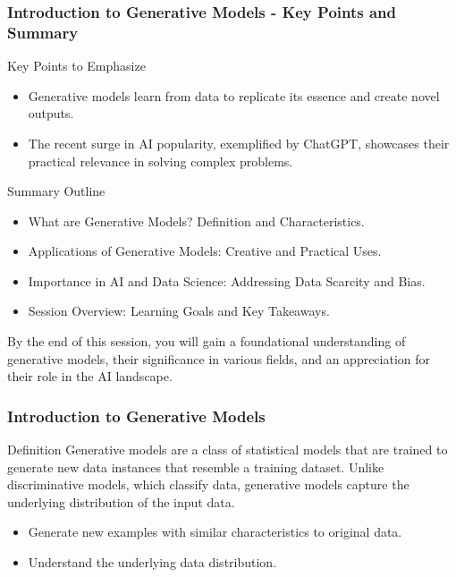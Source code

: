 \documentclass[aspectratio=169]{beamer}
\begin{document}
\begin{frame}[fragile]
    \frametitle{Introduction to Generative Models - Key Points and Summary}
    \begin{block}{Key Points to Emphasize}
        \begin{itemize}
            \item Generative models learn from data to replicate its essence and create novel outputs.
            \item The recent surge in AI popularity, exemplified by ChatGPT, showcases their practical relevance in solving complex problems.
        \end{itemize}
    \end{block}
    
    \begin{block}{Summary Outline}
        \begin{itemize}
            \item What are Generative Models? Definition and Characteristics.
            \item Applications of Generative Models: Creative and Practical Uses.
            \item Importance in AI and Data Science: Addressing Data Scarcity and Bias.
            \item Session Overview: Learning Goals and Key Takeaways.
        \end{itemize}
    \end{block}
    
    By the end of this session, you will gain a foundational understanding of generative models, their significance in various fields, and an appreciation for their role in the AI landscape.
\end{frame}

\begin{frame}[fragile]
    \frametitle{Introduction to Generative Models}
    \begin{block}{Definition}
        Generative models are a class of statistical models that are trained to generate new data instances that resemble a training dataset. Unlike discriminative models, which classify data, generative models capture the underlying distribution of the input data.
    \end{block}
    
    \begin{itemize}
        \item Generate new examples with similar characteristics to original data.
        \item Understand the underlying data distribution.
    \end{itemize}
\end{frame}
\end{document}
